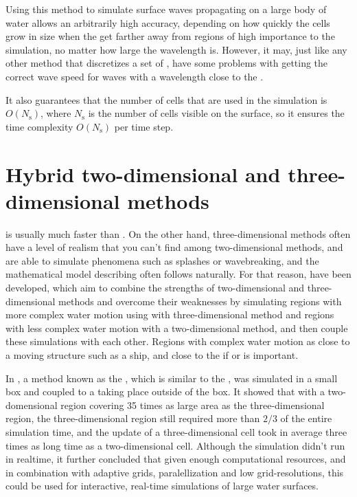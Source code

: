 Using this method to simulate surface waves propagating on a large body of water allows an arbitrarily high accuracy, depending on how quickly the cells grow in size when the get farther away from regions of high importance to the simulation, no matter how large the wavelength is. However, it may, just like any other method that discretizes a set of \PDEs, have some problems with getting the correct wave speed for waves with a wavelength close to the .

It also guarantees that the number of cells that are used in the simulation is $O(N_{\text{s}})$, where $N_{\text{s}}$ is the number of cells visible on the surface, so it ensures the time complexity $O(N_{\text{s}})$ per time step.

\section{Hybrid two-dimensional and three-dimensional methods}

 is usually much faster than . On the other hand, three-dimensional methods often have a level of realism that you can't find among two-dimensional methods, and are able to simulate phenomena such as splashes or wavebreaking, and the mathematical model describing \FSI often follows naturally. For that reason,  have been developed, which aim to combine the strengths of two-dimensional and three-dimensional methods and overcome their weaknesses by simulating regions with more complex water motion using with three-dimensional method and regions with less complex water motion with a two-dimensional method, and then couple these simulations with each other. Regions with complex water motion as close to a moving structure such as a ship, and close to the \shoreline if  or  is important.

In \citep{Thurey2006}, a method known as the , which is similar to the \FVM, was simulated in a small box and coupled to a \SWS taking place outside of the box. It showed that with a two-domensional region covering 35 times as large area as the three-dimensional region, the three-dimensional region still required more than $2/3$ of the entire simulation time, and the update of a three-dimensional cell took in average three times as long time as a two-dimensional cell. Although the simulation didn't run in realtime, it further concluded that given enough computational resources, and in combination with adaptive grids, paralellization and low grid-resolutions, this could be used for interactive, real-time simulations of large water surfaces.

